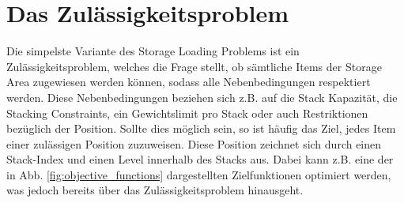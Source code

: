 \pagebreak

\section{Das Zulässigkeitsproblem}
\label{decision_problem}

Die simpelste Variante des Storage Loading Problems ist ein Zulässigkeitsproblem, welches die Frage stellt, ob sämtliche Items der Storage Area zugewiesen werden können, sodass alle Nebenbedingungen respektiert werden.
Diese Nebenbedingungen beziehen sich z.B. auf die Stack Kapazität, die Stacking Constraints, ein Gewichtslimit pro Stack oder auch
Restriktionen bezüglich der Position.\newline
Sollte dies möglich sein, so ist häufig das Ziel, jedes Item einer zulässigen Position zuzuweisen.
Diese Position zeichnet sich durch einen Stack-Index und einen Level innerhalb des Stacks aus.
Dabei kann z.B. eine der in Abb. \ref{fig:objective_functions} dargestellten Zielfunktionen optimiert werden, was jedoch bereits über
das Zulässigkeitsproblem hinausgeht.

\pagebreak

